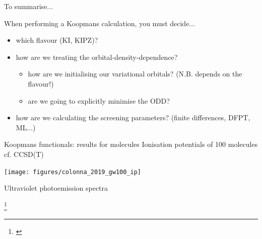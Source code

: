 \documentclass[xcolor=table,aspectratio=169]{beamer}
\newcommand\blfootcite[1]{%
  \begingroup
  \renewcommand\thefootnote{}\footnote{\hspace{-4ex}\cite{#1}}%
  \addtocounter{footnote}{-1}%
  \endgroup
}
\numberwithin{equation}{section}
\begin{document}
\begin{frame}{To summarise...}

   When performing a Koopmans calculation, you must decide...
   \begin{itemize}[<+(1)->]
      \item which flavour (KI, KIPZ)?
      \item how are we treating the orbital-density-dependence?
      \begin{itemize}
         \item how are we initialising our variational orbitals? (N.B. depends on the flavour!)
         \item are we going to explicitly minimise the ODD?
      \end{itemize}
      \item how are we calculating the screening parameters? (finite differences, DFPT, ML...)
   \end{itemize}
   
\end{frame}


\begin{frame}{Koopmans functionals: results for molecules}
   \small
   Ionisation potentials of 100 molecules cf. CCSD(T)
   \begin{center}
      \texttt{[image: figures/colonna\_2019\_gw100\_ip]}
   \end{center}

   \vspace{-3ex}
   Ultraviolet photoemission spectra
   \begin{center}
   \end{center}
   \vspace{-2ex}

   \blfootcite{Colonna2018,Nguyen2015}
\end{frame}
\end{document}
